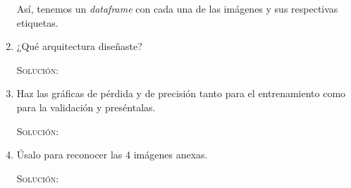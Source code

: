 \documentclass[letterpaper,11pt]{article}
\begin{document}
\begin{enumerate}
    \newpage
    Así, tenemos un \textit{dataframe} con cada una de las imágenes y sus 
    respectivas etiquetas.

    \item ¿Qué arquitectura diseñaste?
    
    \textsc{Solución:}

    \item Haz las gráficas de pérdida y de precisión tanto para el entrenamiento
    como para la validación y preséntalas.

    \textsc{Solución:}

    \item Úsalo para reconocer las $4$ imágenes anexas.
    
    \textsc{Solución:}
\end{enumerate}
\end{document}
